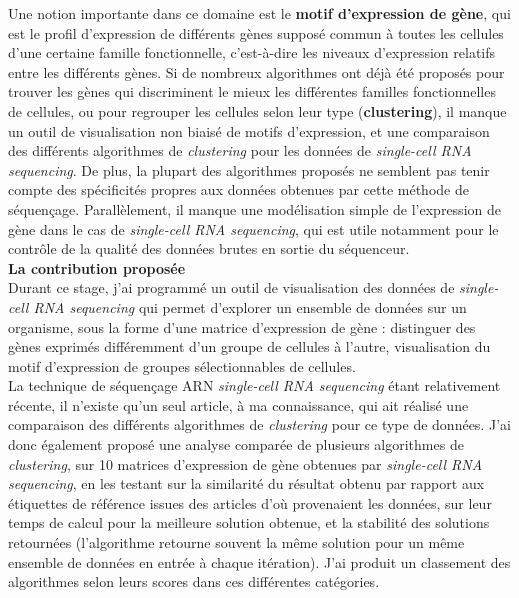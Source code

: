 \documentclass{report}
\begin{document}
{Une notion importante dans ce domaine est le \textbf{motif d'expression de gène}, qui est le profil d'expression de différents gènes supposé commun à toutes les cellules d'une certaine famille fonctionnelle, c'est-à-dire les niveaux d'expression relatifs entre les différents gènes. Si de nombreux algorithmes ont déjà été proposés pour trouver les gènes qui discriminent le mieux les différentes familles fonctionnelles de cellules, ou pour regrouper les cellules selon leur type (\textbf{clustering}), il manque un outil de visualisation non biaisé de motifs d'expression, et une comparaison des différents algorithmes de \textit{clustering} pour les données de \textit{single-cell RNA sequencing}. De plus, la plupart des algorithmes proposés ne semblent pas tenir compte des spécificités propres aux données obtenues par cette méthode de séquençage. Parallèlement, il manque une modélisation simple de l'expression de gène dans le cas de \textit{single-cell RNA sequencing}, qui est utile notamment pour le contrôle de la qualité des données brutes en sortie du séquenceur.\\

\textbf{La contribution proposée}\\

Durant ce stage, j'ai programmé un outil de visualisation des données de \textit{single-cell RNA sequencing} qui permet d'explorer un ensemble de données sur un organisme, sous la forme d'une matrice d'expression de gène : distinguer des gènes exprimés différemment d'un groupe de cellules à l'autre, visualisation du motif d'expression de groupes sélectionnables de cellules.\\

La technique de séquençage ARN \textit{single-cell RNA sequencing} étant relativement récente, il n'existe qu'un seul article, à ma connaissance, qui ait réalisé une comparaison des différents algorithmes de \textit{clustering} pour ce type de données. J'ai donc également proposé une analyse comparée de plusieurs algorithmes de \textit{clustering}, sur 10 matrices d'expression de gène obtenues par \textit{single-cell RNA sequencing}, en les testant sur la similarité du résultat obtenu par rapport aux étiquettes de référence issues des articles d'où provenaient les données, sur leur temps de calcul pour la meilleure solution obtenue, et la stabilité des solutions retournées (l'algorithme retourne souvent la même solution pour un même ensemble de données en entrée à chaque itération). J'ai produit un classement des algorithmes selon leurs scores dans ces différentes catégories.\\

}
\end{document}
